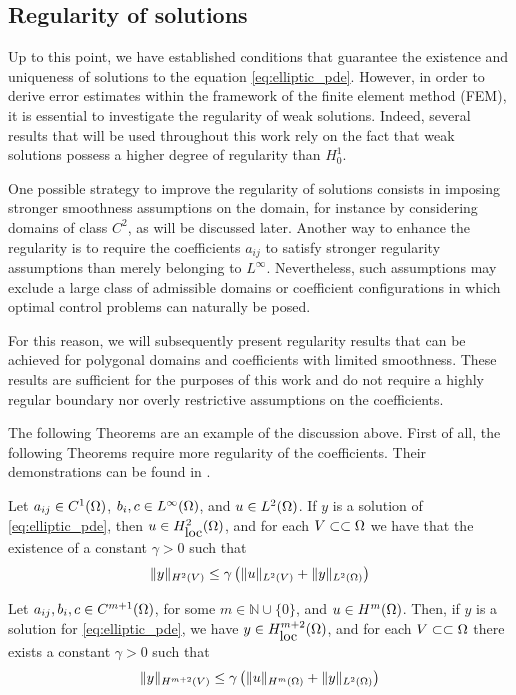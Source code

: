 \subsection{Regularity of solutions}\label{subsection:regularity_pde_sol}

Up to this point, we have established conditions that guarantee the existence and uniqueness of solutions to the equation \eqref{eq:elliptic_pde}. However, in order to derive error estimates within the framework of the finite element method (FEM), it is essential to investigate the regularity of weak solutions. Indeed, several results that will be used throughout this work rely on the fact that weak solutions possess a higher degree of regularity than $H_0^1$.

One possible strategy to improve the regularity of solutions consists in imposing stronger smoothness assumptions on the domain, for instance by considering domains of class $C^2$, as will be discussed later. Another way to enhance the regularity is to require the coefficients $a_{ij}$ to satisfy stronger regularity assumptions than merely belonging to $L^{\infty}$. Nevertheless, such assumptions may exclude a large class of admissible domains or coefficient configurations in which optimal control problems can naturally be posed.

For this reason, we will subsequently present regularity results that can be achieved for polygonal domains and coefficients with limited smoothness. These results are sufficient for the purposes of this work and do not require a highly regular boundary nor overly restrictive assumptions on the coefficients. 

The following Theorems are an example of the discussion above. First of all, the following Theorems require more regularity of the coefficients. Their demonstrations can be found in \cite{evanspde}.

\begin{theorem}
    Let $a_{ij}\in C^{1}(\Omega)$, $b_{i}, c \in L^{\infty}(\Omega)$, and $u\in L^2(\Omega)$. If $y$ is a solution of \eqref{eq:elliptic_pde}, then $u\in H_{\mbox{loc}}^2(\Omega)$, and for each $V\subset\subset \Omega$ we have that the existence of a constant $\gamma>0$ such that
    \[
    \lVert y \rVert_{H^{2}(V)}\le \gamma \left(\lVert u \rVert_{L^2(V)}+\lVert y \rVert_{L^2(\Omega)}\right)
    \]
\end{theorem}

\begin{theorem}
    Let $a_{ij}, b_i, c \in C^{m+1}(\Omega)$, for some $m \in \mathbb{N}\cup \{0\}$, and $u\in H^{m}(\Omega)$. Then, if $y$ is a solution for \eqref{eq:elliptic_pde}, we have $y\in H^{m+2}_{\mbox{loc}}(\Omega)$, and for each $V\subset\subset \Omega$ there exists a constant $\gamma>0$ such that
    \[
    \lVert y \rVert_{H^{m+2}(V)}\le \gamma\left(\lVert u \rVert_{H^{m}(\Omega)}+\lVert y \rVert_{L^2(\Omega)}\right)
    \]
\end{theorem}


